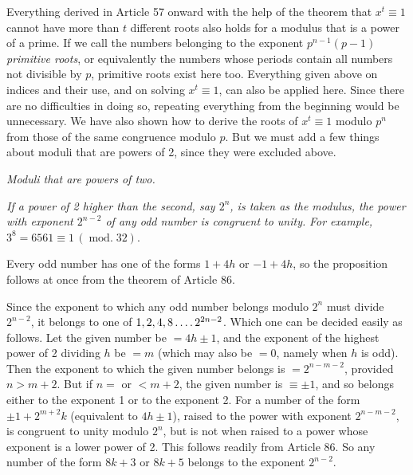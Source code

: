 Everything derived in Article 57 onward with the help of the theorem that $x^t\equiv1$ cannot have more than $t$ different roots also holds for a modulus that is a power of a prime. If we call the numbers belonging to the exponent $p^{n-1}(p-1)$ \emph{primitive roots}, or equivalently the numbers whose periods contain all numbers not divisible by $p$, primitive roots exist here too. Everything given above on indices and their use, and on solving $x^t\equiv1$, can also be applied here. Since there are no difficulties in doing so, repeating everything from the beginning would be unnecessary. We have also shown how to derive the roots of $x^t\equiv1$ modulo $p^n$ from those of the same congruence modulo $p$. But we must add a few things about moduli that are powers of 2, since they were excluded above.

\begin{center}\emph{Moduli that are powers of two.}\end{center}

\emph{If a power of 2 higher than the second, say $2^n$, is taken as the modulus, the power with exponent $2^{n-2}$ of any odd number is congruent to unity.}
\emph{For example,} $3^8=6561\equiv1\,(\operatorname{mod.}32)$.

Every odd number has one of the forms $1+4h$ or $-1+4h$, so the proposition follows at once from the theorem of Article 86.

Since the exponent to which any odd number belongs modulo $2^n$ must divide $2^{n-2}$, it belongs to one of $1,2,4,8\mathinner{.\,.\,.\,.}2^{2n-2}$. Which one can be decided easily as follows. Let the given number be $=4h\pm1$, and the exponent of the highest power of 2 dividing $h$ be $=m$ (which may also be $=0$, namely when $h$ is odd). Then the exponent to which the given number belongs is $=2^{n-m-2}$, provided $n>m+2$. But if $n=$ or $<m+2$, the given number is $\equiv\pm1$, and so belongs either to the exponent 1 or to the exponent 2. For a number of the form $\pm1+2^{m+2}k$ (equivalent to $4h\pm1$), raised to the power with exponent $2^{n-m-2}$, is congruent to unity modulo $2^n$, but is not when raised to a power whose exponent is a lower power of 2. This follows readily from Article 86. So any number of the form $8k+3$ or $8k+5$ belongs to the exponent $2^{n-2}$.

